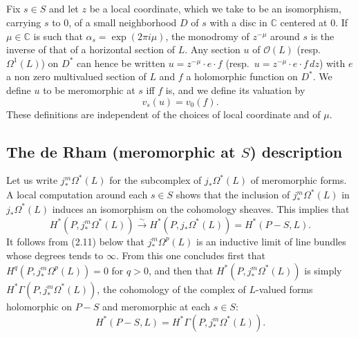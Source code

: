 \documentclass[12pt,a4paper]{article}
\theoremstyle{plain}
\theoremstyle{definition}
\theoremstyle{remark}
\newcommand{\CC}{\mathbb{C}}
\numberwithin{equation}{section}
\providecommand{\CC}{\mathbb{C}}
\begin{document}
\subsection{}
Fix $s \in S$ and let $z$ be a local coordinate, which we take to be an isomorphism, carrying $s$ to $0$, of a small neighborhood $D$ of $s$ with a disc in $\CC$ centered at $0$. If $\mu \in \CC$ is such that $\alpha_s = \exp(2\pi i \mu)$, the monodromy of $z^{-\mu}$ around $s$ is the inverse of that of a horizontal section of $L$. Any section $u$ of $\mathcal{O}(L)$ (resp.\ $\Omega^1(L)$) on $D^*$ can hence be written $u = z^{-\mu} \cdot e \cdot f$ (resp.\ $u = z^{-\mu} \cdot e \cdot f \, dz$) with $e$ a non zero multivalued section of $L$ and $f$ a holomorphic function on $D^*$. We define $u$ to be meromorphic at $s$ iff $f$ is, and we define its valuation by
\[
v_s(u) = v_0(f).
\]
These definitions are independent of the choices of local coordinate and of $\mu$.

\subsection{The de Rham (meromorphic at $S$) description}
Let us write $j_*^m \Omega^*(L)$ for the subcomplex of $j_*\Omega^*(L)$ of meromorphic forms. A local computation around each $s \in S$ shows that the inclusion of $j_*^m \Omega^*(L)$ in $j_*\Omega^*(L)$ induces an isomorphism on the cohomology sheaves. This implies that
\begin{equation}\label{eq:2.10.1}
H^*(P, j_*^m\Omega^*(L)) \xrightarrow{\sim} H^*(P, j_*\Omega^*(L)) = H^*(P-S, L).
\end{equation}
It follows from (2.11) below that $j_*^m \Omega^p(L)$ is an inductive limit of line bundles whose degrees tends to $\infty$. From this one concludes first that $H^q(P, j_*^m \Omega^p(L)) = 0$ for $q > 0$, and then that $H^*(P, j_*^m \Omega^*(L))$ is simply $H^*\Gamma(P, j_*^m \Omega^*(L))$, the cohomology of the complex of $L$-valued forms holomorphic on $P-S$ and meromorphic at each $s \in S$:
\begin{equation}\label{eq:2.10.2}
H^*(P-S, L) = H^*\Gamma(P, j_*^m \Omega^*(L)).
\end{equation}
\end{document}
